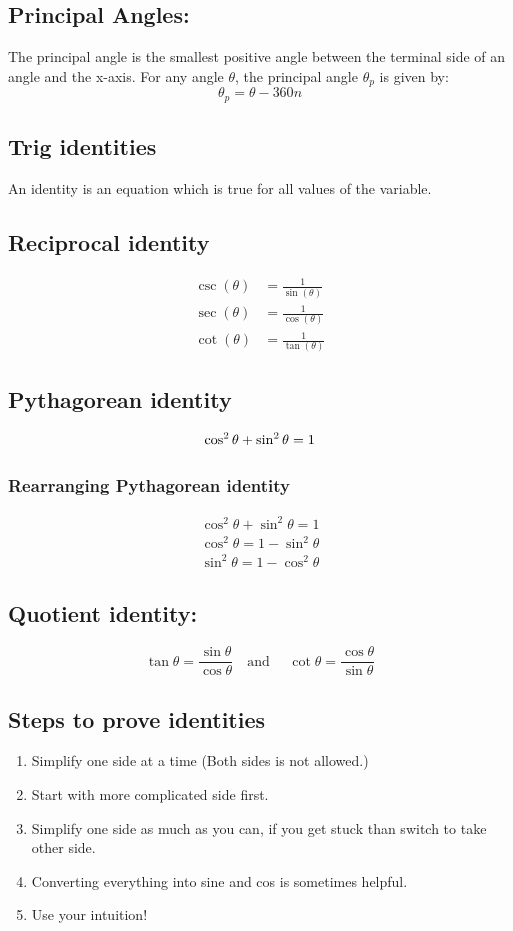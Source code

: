 \documentclass[12pt,a4paper]{article}
\begin{document}
\subsection{Principal Angles:}
The principal angle is the smallest positive angle between the terminal side of an angle and the x-axis. For any angle $\theta$, the principal angle $\theta_p$ is given by:
\[ \theta_p = \theta - 360n \]
\newpage
\subsection{Trig identities}
An identity is an equation which is true for all values of the variable. 
\subsection{Reciprocal identity}
\begin{align*}
\csc(\theta) &= \frac{1}{\sin(\theta)} \\
\sec(\theta) &= \frac{1}{\cos(\theta)} \\
\cot(\theta) &= \frac{1}{\tan(\theta)}
\end{align*}
\subsection{Pythagorean identity}

$$\cos^2\theta +\sin^2\theta =1\\$$

\subsubsection*{Rearranging Pythagorean identity}
\begin{align*}
    \cos^2\theta +\sin^2\theta =1\\
    \cos^2\theta =1-\sin^2\theta\\
    \sin^2\theta=1-\cos^2\theta
\end{align*}
\subsection{Quotient identity:}
\[\tan\theta =\frac{\sin \theta}{\cos \theta} \quad \text{and } \quad \cot\theta=\frac{\cos\theta}{\sin\theta}\]
\subsection*{Steps to prove identities}
\begin{enumerate}
    \item Simplify one side at a time (Both sides is not allowed.)
    \item Start with more complicated side first.
    \item Simplify one side as much as you can, if you get stuck than switch to take other side.
    \item Converting everything into sine and cos is sometimes helpful.
    \item Use your intuition!
\end{enumerate}
\newpage
\end{document}
